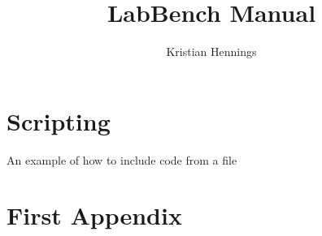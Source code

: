 \documentclass[12pt, twoside, a4paper]{book}
\begin{document}
\title{LabBench Manual}
\author{Kristian Hennings}

\frontmatter
\maketitle

\tableofcontents



\mainmatter










\chapter{Scripting}

An example of how to include code from a file




\appendix




\chapter{First Appendix}

\backmatter
\end{document}
